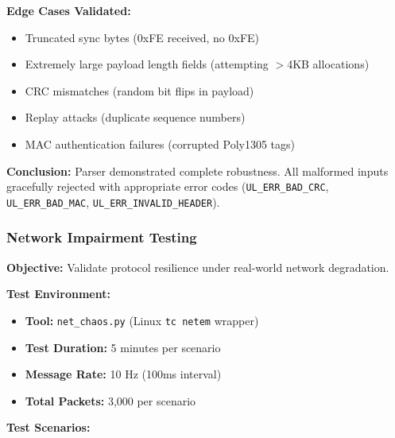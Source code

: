 \documentclass[11pt,a4paper]{article}
\begin{document}
\textbf{Edge Cases Validated:}
\begin{itemize}[noitemsep]
    \item Truncated sync bytes (0xFE received, no 0xFE)
    \item Extremely large payload length fields (attempting $>$4KB allocations)
    \item CRC mismatches (random bit flips in payload)
    \item Replay attacks (duplicate sequence numbers)
    \item MAC authentication failures (corrupted Poly1305 tags)
\end{itemize}

\textbf{Conclusion:} Parser demonstrated complete robustness. All malformed inputs gracefully rejected with appropriate error codes (\texttt{UL\_ERR\_BAD\_CRC}, \texttt{UL\_ERR\_BAD\_MAC}, \texttt{UL\_ERR\_INVALID\_HEADER}).

\subsubsection{Network Impairment Testing}

\textbf{Objective:} Validate protocol resilience under real-world network degradation.

\textbf{Test Environment:}
\begin{itemize}[noitemsep]
    \item \textbf{Tool:} \texttt{net\_chaos.py} (Linux \texttt{tc netem} wrapper)
    \item \textbf{Test Duration:} 5 minutes per scenario
    \item \textbf{Message Rate:} 10 Hz (100ms interval)
    \item \textbf{Total Packets:} 3,000 per scenario
\end{itemize}

\textbf{Test Scenarios:}
\end{document}
